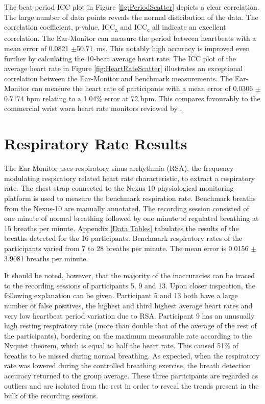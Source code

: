 \medskip

The beat period ICC plot in Figure \ref{fig:PeriodScatter} depicts a clear correlation. The large number of data points reveals the normal distribution of the data. The correlation coefficient, p-value, ICC\textsubscript{a} and ICC\textsubscript{c} all indicate an excellent correlation. The Ear-Monitor can measure the period between heartbeats with a mean error of 0.0821 $\pm$\SI{50.71}{\milli\second}. This notably high accuracy is improved even further by calculating the 10-beat average heart rate. The ICC plot of the average heart rate in Figure \ref{fig:HeartRateScatter} illustrates an exceptional correlation between the Ear-Monitor and benchmark measurements. The Ear-Monitor can measure the heart rate of participants with a mean error of 0.0306 $\pm$0.7174 bpm relating to a 1.04\% error at 72 bpm. This compares favourably to the commercial wrist worn heart rate monitors reviewed by \cite{shcherbina2017accuracy}.


\section{Respiratory Rate Results}
The Ear-Monitor uses respiratory sinus arrhythmia (RSA), the frequency modulating respiratory related heart rate characteristic, to extract a respiratory rate. The chest strap connected to the Nexus-10 physiological monitoring platform is used to measure the benchmark respiration rate. Benchmark breaths from the Nexus-10 are manually annotated. The recording session consisted of one minute of normal breathing followed by one minute of regulated breathing at 15 breaths per minute. Appendix \ref{Data Tables} tabulates the results of the breaths detected for the 16 participants. Benchmark respiratory rates of the participants varied from 7 to 28 breaths per minute. The mean error is 0.0156 $\pm$3.9081 breaths per minute.

\medskip
It should be noted, however, that the majority of the inaccuracies can be traced to the recording sessions of participants 5, 9 and 13. Upon closer inspection, the following explanation can be given. Participant 5 and 13 both have a large number of false positives, the highest and third highest average heart rates and very low heartbeat period variation due to RSA. Participant 9 has an unusually high resting respiratory rate (more than double that of the average of the rest of the participants), bordering on the maximum measurable rate according to the Nyquist theorem, which is equal to half the heart rate. This caused 51\% of breaths to be missed during normal breathing. As expected, when the respiratory rate was lowered during the controlled breathing exercise, the breath detection accuracy returned to the group average. These three participants are regarded as outliers and are isolated from the rest in order to reveal the trends present in the bulk of the recording sessions.

